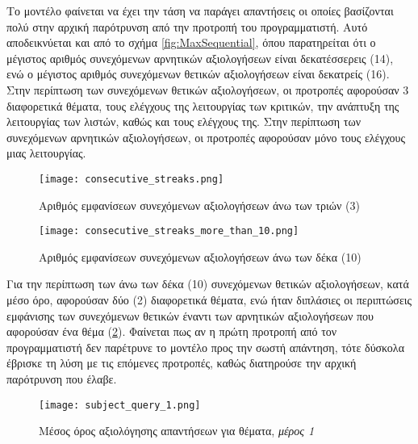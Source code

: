 Το μοντέλο φαίνεται να έχει την τάση να παράγει απαντήσεις οι οποίες
βασίζονται πολύ στην αρχική παρότρυνση από την προτροπή του
προγραμματιστή. Αυτό αποδεικνύεται και από το σχήμα
\ref{fig:MaxSequential}, όπου παρατηρείται ότι ο μέγιστος αριθμός
συνεχόμενων αρνητικών αξιολογήσεων είναι δεκατέσσερεις (14), ενώ ο
μέγιστος αριθμός συνεχόμενων θετικών αξιολογήσεων είναι δεκατρείς (16).
Στην περίπτωση των συνεχόμενων θετικών αξιολογήσεων, οι προτροπές
αφορούσαν 3 διαφορετικά θέματα, τους ελέγχους της λειτουργίας των
κριτικών, την ανάπτυξη της λειτουργίας των λιστών, καθώς και τους
ελέγχους της. Στην περίπτωση των συνεχόμενων αρνητικών αξιολογήσεων, οι
προτροπές αφορούσαν μόνο τους ελέγχους μιας λειτουργίας.

\begin{figure}[H]
  \begin{center}
    \texttt{[image: consecutive\_streaks.png]}
    \caption{Αριθμός εμφανίσεων συνεχόμενων αξιολογήσεων άνω των τριών
    (3)}
  \end{center}
  \label{fig:ConsecutiveStreaks}
\end{figure}

\begin{figure}[H]
  \begin{center}
    \texttt{[image: consecutive\_streaks\_more\_than\_10.png]}
    \caption{Αριθμός εμφανίσεων συνεχόμενων αξιολογήσεων άνω των δέκα
    (10)}
  \label{fig:ConsecutiveStreaks10}
  \end{center}
\end{figure}

Για την περίπτωση των άνω των δέκα (10) συνεχόμενων θετικών
αξιολογήσεων, κατά μέσο όρο, αφορούσαν δύο (2) διαφορετικά θέματα, ενώ
ήταν διπλάσιες οι περιπτώσεις εμφάνισης των συνεχόμενων θετικών έναντι
των αρνητικών αξιολογήσεων που αφορούσαν ένα θέμα (\ref{fig:ConsecutiveStreaks10}).
Φαίνεται πως αν η πρώτη προτροπή από τον
προγραμματιστή δεν παρέτρυνε το μοντέλο προς την σωστή απάντηση, τότε δύσκολα έβρισκε τη
λύση με τις επόμενες προτροπές, καθώς διατηρούσε την αρχική παρότρυνση
που έλαβε.

\begin{figure}[H]
  \begin{center}
    \texttt{[image: subject\_query\_1.png]}
    \caption{Μέσος όρος αξιολόγησης απαντήσεων για θέματα, \textit{μέρος
    1}}
      \label{fig:SubjectQuery1}
  \end{center}
\end{figure}

